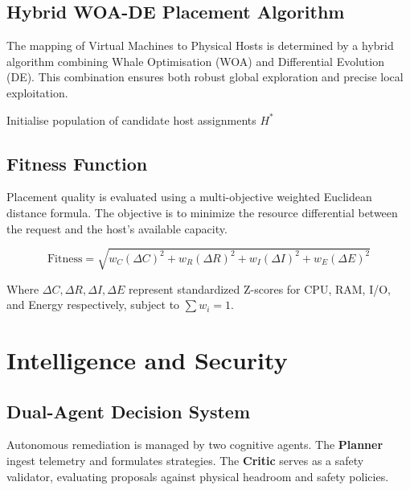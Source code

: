 \documentclass[12pt,a4paper]{report}
\begin{document}
\subsection{Hybrid WOA-DE Placement Algorithm}
The mapping of Virtual Machines to Physical Hosts is determined by a hybrid algorithm combining Whale Optimisation (WOA) and Differential Evolution (DE). This combination ensures both robust global exploration and precise local exploitation.

\begin{algorithm}[H]
\DontPrintSemicolon
{}
Initialise population of candidate host assignments\;
\Return $H^*$\;
\caption{Hybrid WOA-DE Provisioning Algorithm}
\label{alg:woa_de}
\end{algorithm}

\subsection{Fitness Function}
Placement quality is evaluated using a multi-objective weighted Euclidean distance formula. The objective is to minimize the resource differential between the request and the host's available capacity.

\begin{equation}
\text{Fitness} = \sqrt{w_C (\Delta C)^2 + w_R (\Delta R)^2 + w_I (\Delta I)^2 + w_E (\Delta E)^2}
\end{equation}

Where $\Delta C, \Delta R, \Delta I, \Delta E$ represent standardized Z-scores for CPU, RAM, I/O, and Energy respectively, subject to $\sum w_i = 1$.

\section{Intelligence and Security}

\subsection{Dual-Agent Decision System}
Autonomous remediation is managed by two cognitive agents. The \textbf{Planner} ingest telemetry and formulates strategies. The \textbf{Critic} serves as a safety validator, evaluating proposals against physical headroom and safety policies.
\end{document}
